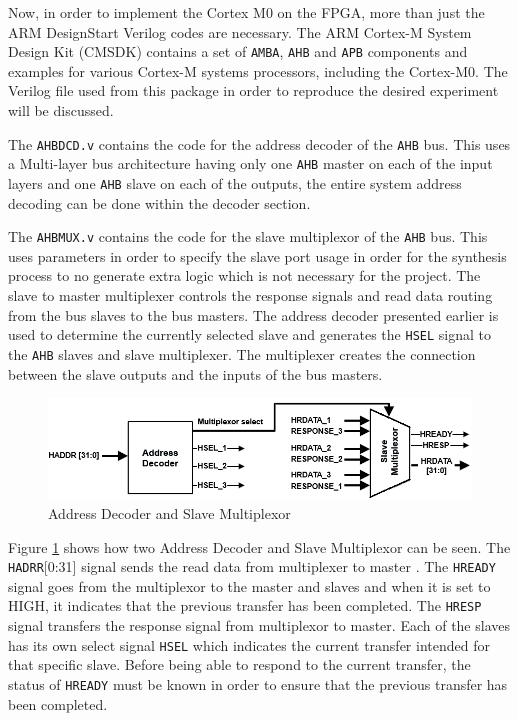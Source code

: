Now, in order to implement the Cortex M0 on the FPGA, more than just the ARM DesignStart Verilog codes are necessary. The ARM Cortex-M System Design Kit (CMSDK) contains a set of \verb|AMBA|, \verb|AHB| and \verb|APB| components and examples for various Cortex-M systems processors, including the Cortex-M0. The  Verilog file  used from this package in order to reproduce the desired experiment will be discussed.

The \verb|AHBDCD.v| contains the code for the address decoder of the \verb|AHB| bus. This uses a Multi-layer bus architecture having only one \verb|AHB| master on each of the input layers and one \verb|AHB| slave on each of the outputs, the entire system address decoding can be done within the decoder section. 

The \verb|AHBMUX.v| contains the code for the slave multiplexor of the \verb|AHB| bus. This uses parameters in order to specify the slave port usage in order for the synthesis process to no generate extra logic which is not necessary for the project. The slave to master multiplexer controls the response signals and read data routing from the bus slaves to the bus masters. The address decoder presented earlier is used to determine the currently selected slave and generates the \verb|HSEL| signal to the \verb|AHB| slaves and slave multiplexer. The multiplexer creates the connection between the slave outputs and the inputs of the bus masters. 

\begin{figure}
\centering
\includegraphics[scale=0.7]{figures/decoder_and_multiplexer.PNG}
\caption{Address Decoder and Slave Multiplexor\cite{ahblite} } 
\label{fig:decoder_multiplexer}
\end{figure}

Figure \ref{fig:decoder_multiplexer} shows how two Address Decoder and Slave Multiplexor can be seen. The \verb|HADRR|[0:31] signal sends the read data from multiplexer to master \cite{ahblite}. The \verb|HREADY| signal goes from the multiplexor to the master and slaves and when it is set to HIGH, it indicates that the previous transfer has been completed. The \verb|HRESP| signal transfers the response signal from multiplexor to master. Each of the slaves has its own select signal \verb|HSEL| which indicates the current transfer intended for that specific slave. Before being able to respond to the current transfer, the status of \verb|HREADY| must be known in order to ensure that the previous transfer has been completed. 

